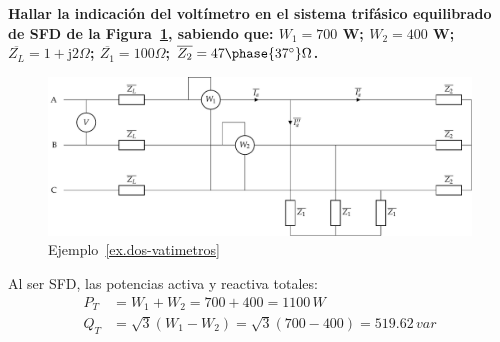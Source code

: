 \begin{example}\label{ex.dos-vatimetros}
\textbf{Hallar la indicación del voltímetro en el sistema trifásico equilibrado de SFD de la Figura~\ref{fig.ej_dosvat}, sabiendo que: $W_1=700$ W; $W_2=400$ W; $\overline{Z_L}=1+\mathrm{j}2\Omega$; $\overline{Z_1}=100\Omega$; $\overline{Z_2}=47\phase{37^\circ}\Omega$.}
\begin{figure}[H]
    \centering
    \includegraphics[width=.9\linewidth]{../figs/ej_dosvat.pdf}
    \caption{Ejemplo~\ref{ex.dos-vatimetros}}
    \label{fig.ej_dosvat}
\end{figure}

Al ser SFD, las potencias activa y reactiva totales:
\begin{align*}
    P_T&=W_1+W_2=700+400=1100\,W\\
    Q_T&=\sqrt{3}(W_1-W_2)=\sqrt{3}(700-400)=519.62\,var
\end{align*}


\end{example}
